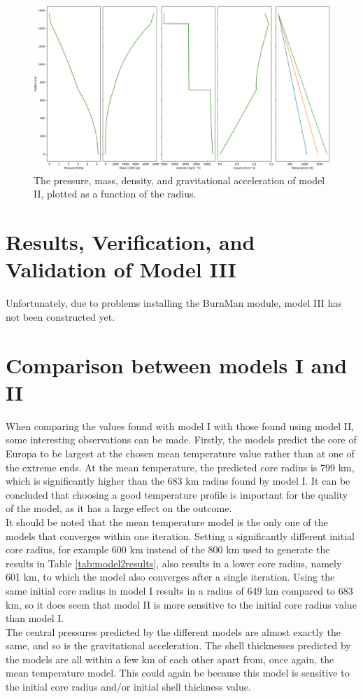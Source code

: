 \documentclass[twocolumn]{article}
\begin{document}
\begin{figure}[h]
	\centering
	\includegraphics[width=\textwidth]{profile2.png}
	\caption{The pressure, mass, density, and gravitational acceleration of model II, plotted as a function of the radius.}
	\label{fig:profile2}
\end{figure}
\section{Results, Verification, and Validation of Model III}
\label{sec:model3}
Unfortunately, due to problems installing the BurnMan module, model III has not been constructed yet.
\section{Comparison between models I and II}
When comparing the values found with model I with those found using model II, some interesting observations can be made. Firstly, the models predict the core of Europa to be largest at the chosen mean temperature value rather than at one of the extreme ends. At the mean temperature, the predicted core radius is 799 km, which is significantly higher than the 683 km radius found by model I. It can be concluded that choosing a good temperature profile is important for the quality of the model, as it has a large effect on the outcome.\\
It should be noted that the mean temperature model is the only one of the models that converges within one iteration. Setting a significantly different initial core radius, for example 600 km instead of the 800 km used to generate the results in Table \ref{tab:model2results}, also results in a lower core radius, namely 601 km, to which the model also converges after a single iteration. Using the same initial core radius in model I results in a radius of 649 km compared to 683 km, so it does seem that model II is more sensitive to the initial core radius value than model I.\\
The central pressures predicted by the different models are almost exactly the same, and so is the gravitational acceleration. The shell thicknesses predicted by the models are all within a few km of each other apart from, once again, the mean temperature model. This could again be because this model is sensitive to the initial core radius and/or initial shell thickness value.
\end{document}
